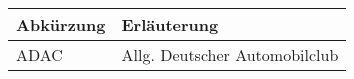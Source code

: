 \documentclass[12pt,ngerman]{scrartcl}
\begin{document}
\begin{tabular}{ll} \toprule
\bfseries Abkürzung & \bfseries Erläuterung \\ \midrule
ADAC & Allg. Deutscher Automobilclub \\ \bottomrule
\end{tabular}
\end{document}
